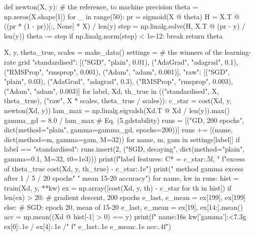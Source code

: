 \begin{Python}{}
def newton(X, y):                        # the reference, to machine precision
    theta = np.zeros(X.shape[1])
    for _ in range(50):
        pr = sigmoid(X @ theta)
        H = X.T @ ((pr * (1 - pr))[:, None] * X) / len(y)
        step = np.linalg.solve(H, X.T @ (pr - y) / len(y))
        theta -= step
        if np.linalg.norm(step) < 1e-12:
            break
    return theta

X, y, theta_true, scales = make_data()
settings = {                             # the winners of the learning-rate grid
    "standardised": [("SGD", "plain", 0.01), ("AdaGrad", "adagrad", 0.1),
                     ("RMSProp", "rmsprop", 0.001), ("Adam", "adam", 0.001)],
    "raw":          [("SGD", "plain", 0.03), ("AdaGrad", "adagrad", 0.3),
                     ("RMSProp", "rmsprop", 0.003), ("Adam", "adam", 0.003)]}
for label, Xd, th_true in (("standardised", X, theta_true),
                           ("raw", X * scales, theta_true / scales)):
    c_star = cost(Xd, y, newton(Xd, y))
    lam_max = np.linalg.eigvalsh(Xd.T @ Xd / len(y)).max()
    gamma_gd = 8.0 / lam_max                       # Eq. (5.gdstability)
    runs = [("GD, 200 epochs",
             dict(method="plain", gamma=gamma_gd, epochs=200))]
    runs += [(name, dict(method=m, gamma=gam, M=32))
             for name, m, gam in settings[label]]
    if label == "standardised":
        runs.insert(2, ("SGD, decaying",
                        dict(method="plain", gamma=0.1, M=32, t0=1e3)))
    print(f"{label} features: C* = {c_star:.5f}, "
          f"excess of theta_true {cost(Xd, y, th_true) - c_star:.1e}")
    print("  method           gamma    excess after 1 / 5 / 20 epochs"
          "   mean 15-20   accuracy")
    for name, kw in runs:
        hist = train(Xd, y, **kw)
        ex = np.array([cost(Xd, y, th) - c_star for th in hist])
        if len(ex) > 20:                       # gradient descent, 200 epochs
            e_last, e_mean = ex[199], ex[199]
        else:                                  # SGD: epoch 20, mean of 15-20
            e_last, e_mean = ex[19], ex[14:].mean()
        acc = np.mean((Xd @ hist[-1] > 0) == y)
        print(f"  {name:16s} {kw['gamma']:<7.3g}  {ex[0]:.1e} / {ex[4]:.1e} /"
              f" {e_last:.1e}      {e_mean:.1e}     {acc:.4f}")
\end{Python}

